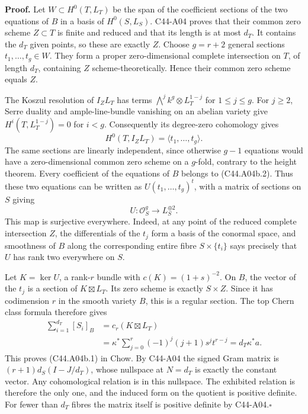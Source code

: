 \documentclass[11pt]{article}
\theoremstyle{remark}\newtheorem{remark}[theorem]{Remark}
\begin{document}
\textbf{Proof.}
Let $W\subset H^0(T,L_T)$ be the span of the coefficient sections
of the two equations of $B$ in a basis of $H^0(S,L_S)$.
C44-A04 proves that their common zero scheme $Z\subset T$ is
finite and reduced and that its length is at most $d_T$.
It contains the $d_T$ given points, so these are exactly $Z$.
Choose $g=r+2$ general sections $t_1,\ldots,t_g\in W$.
They form a proper zero-dimensional complete intersection on
$T$, of length $d_T$, containing $Z$ scheme-theoretically.
Hence their common zero scheme equals $Z$.

The Koszul resolution of $I_ZL_T$ has terms
$\bigwedge^j k^g\otimes L_T^{1-j}$ for $1\le j\le g$.
For $j\ge2$, Serre duality and ample-line-bundle vanishing on an
abelian variety give
$H^i(T,L_T^{1-j})=0$ for $i<g$. Consequently its degree-zero
cohomology gives
\[
 H^0(T,I_ZL_T)=\langle t_1,\ldots,t_g\rangle.
 \tag{C44.A04b.2}
\]
The same sections are linearly independent, since otherwise
$g-1$ equations would have a zero-dimensional common zero scheme
on a $g$-fold, contrary to the height theorem. Every coefficient
of the equations of $B$ belongs to (C44.A04b.2). Thus these two
equations can be written as $U(t_1,\ldots,t_g)^t$, with a matrix
of sections on $S$ giving
\[
 U:\mathcal O_S^{g}\longrightarrow L_S^{\oplus2}.
\]
This map is surjective everywhere. Indeed, at any point of the
reduced complete intersection $Z$, the differentials of the
$t_j$ form a basis of the conormal space, and smoothness of $B$
along the corresponding entire fibre $S\times\{t_i\}$ says
precisely that $U$ has rank two everywhere on $S$.

Let $K=\ker U$, a rank-$r$ bundle with
$c(K)=(1+s)^{-2}$. On $B$, the vector of the $t_j$ is a section
of $K\boxtimes L_T$. Its zero scheme is exactly $S\times Z$.
Since it has codimension $r$ in the smooth variety $B$, this is
a regular section. The top Chern class formula therefore gives
\[
 \begin{split}
 \sum_{i=1}^{d_T}[S_i]_B
 &=c_r(K\boxtimes L_T)\\
 &=\kappa^*\sum_{j=0}^r(-1)^j(j+1)s^jt^{r-j}
 =d_T\kappa^*a.
 \end{split}
\]
This proves (C44.A04b.1) in Chow. By C44-A04 the signed Gram
matrix is $(r+1)d_S(I-J/d_T)$, whose nullspace at $N=d_T$ is
exactly the constant vector. Any cohomological relation is in
this nullspace. The exhibited relation is therefore the only
one, and the induced form on the quotient is positive definite.
For fewer than $d_T$ fibres the matrix itself is positive
definite by C44-A04.\hfill$\square$
\end{document}
